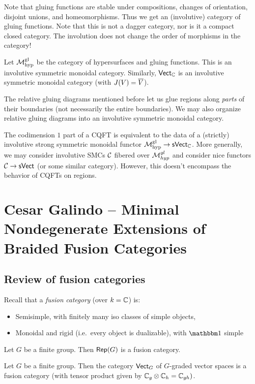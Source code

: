 \documentclass{amsart}
\begin{document}
Note that gluing functions are stable under compositions, changes of orientation, disjoint unions, and homeomorphisms.
Thus we get an (involutive) category of gluing functions.
Note that this is not a dagger category, nor is it a compact closed category.
The involution does not change the order of morphisms in the category!

Let $\mathcal{M}_{\mathrm{hyp}}^{\mathrm{gl}}$ be the category of hypersurfaces and gluing functions.
This is an involutive symmetric monoidal category.
Similarly, $\mathsf{Vect}_{\mathbb{C}}$ is an involutive symmetric monoidal category (with $J(V) = \overline{V}$).

The relative gluing diagrams mentioned before let us glue regions along \emph{parts} of their boundaries (not necessarily the entire boundaries).
We may also organize relative gluing diagrams into an involutive symmetric monoidal category.

The codimension $1$ part of a CQFT is equivalent to the data of a (strictly) involutive strong symmetric monoidal functor $\mathcal{M}_{\mathrm{hyp}}^{\mathrm{gl}} \to \mathsf{sVect}_{\mathbb{C}}$.
More generally, we may consider involutive SMCs $\mathcal{C}$ fibered over $\mathcal{M}_{hyp}^{gl}$ and consider nice functors $\mathcal{C} \to \mathsf{sVect}$ (or some similar category).
However, this doesn't encompass the behavior of CQFTs on regions.

\section{Cesar Galindo -- Minimal Nondegenerate Extensions of Braided Fusion Categories}

\subsection{Review of fusion categories}

Recall that a \emph{fusion category} (over $k = \mathbb{C}$) is:
\begin{itemize}
  \item Semisimple, with finitely many iso classes of simple objects,
  \item Monoidal and rigid (i.e.\ every object is dualizable), with $\onebb$ simple
\end{itemize}

\begin{ex}
  Let $G$ be a finite group.
  Then $\operatorname{\mathsf{Rep}}(G)$ is a fusion category.
\end{ex}

\begin{ex}
  Let $G$ be a finite group.
  Then the category $\mathsf{Vect}_G$ of $G$-graded vector spaces is a fusion category (with tensor product given by $\mathbb{C}_g \otimes \mathbb{C}_h = \mathbb{C}_{gh})$.
\end{ex}
\end{document}
